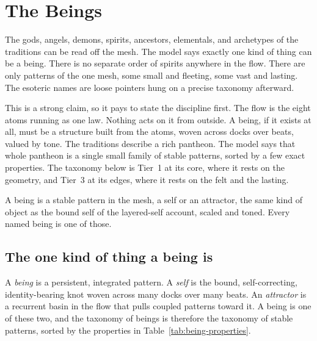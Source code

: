 \section{The Beings}

The gods, angels, demons, spirits, ancestors, elementals, and archetypes of the traditions can be read off the mesh. The model says exactly one kind of thing can be a being. There is no separate order of spirits anywhere in the flow. There are only patterns of the one mesh, some small and fleeting, some vast and lasting. The esoteric names are loose pointers hung on a precise taxonomy afterward.

This is a strong claim, so it pays to state the discipline first. The flow is the eight atoms running as one law. Nothing acts on it from outside. A being, if it exists at all, must be a structure built from the atoms, woven across docks over beats, valued by tone. The traditions describe a rich pantheon. The model says that whole pantheon is a single small family of stable patterns, sorted by a few exact properties. The taxonomy below is Tier~1 at its core, where it rests on the geometry, and Tier~3 at its edges, where it rests on the felt and the lasting.

\begin{principle}
A being is a stable pattern in the mesh, a self or an attractor, the same kind of object as the bound self of the layered-self account, scaled and toned. Every named being is one of those.
\end{principle}

\subsection{The one kind of thing a being is}

A \emph{being} is a persistent, integrated pattern. A \emph{self} is the bound, self-correcting, identity-bearing knot woven across many docks over many beats. An \emph{attractor} is a recurrent basin in the flow that pulls coupled patterns toward it. A being is one of these two, and the taxonomy of beings is therefore the taxonomy of stable patterns, sorted by the properties in Table~\ref{tab:being-properties}.

